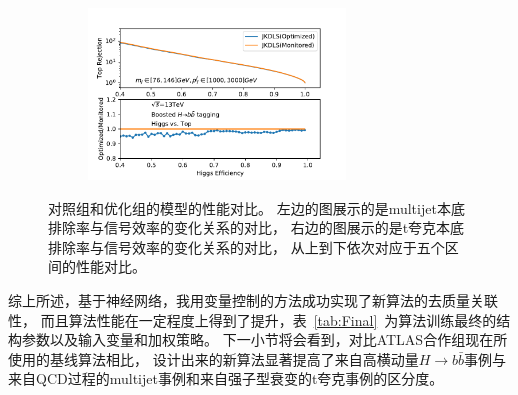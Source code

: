 \begin{figure}[htbp]
\begin{subfigure}{.5\textwidth}
    \caption{}
   \label{fig:}
  \end{subfigure}
  \begin{subfigure}{.5\textwidth}
  \centering
   \includegraphics[width=0.75\textwidth]{figuresXbb/OPT/OPTopMASSPT3.pdf}
    \caption{}
   \label{fig:}
  \end{subfigure}
  \caption{
对照组和优化组的模型的性能对比。
左边的图展示的是multijet本底排除率与信号效率的变化关系的对比，
右边的图展示的是t夸克本底排除率与信号效率的变化关系的对比，
从上到下依次对应于五个区间的性能对比。
  }
  \label{fig:OPTROC}
\end{figure} 

综上所述，基于神经网络，我用变量控制的方法成功实现了新算法的去质量关联性，
而且算法性能在一定程度上得到了提升，表~\ref{tab:Final}~为算法训练最终的结构参数以及输入变量和加权策略。
下一小节将会看到，对比ATLAS合作组现在所使用的基线算法相比，
设计出来的新算法显著提高了来自高横动量$H\rightarrow b\bar{b}$事例与来自QCD过程的multijet事例和来自强子型衰变的t夸克事例的区分度。


